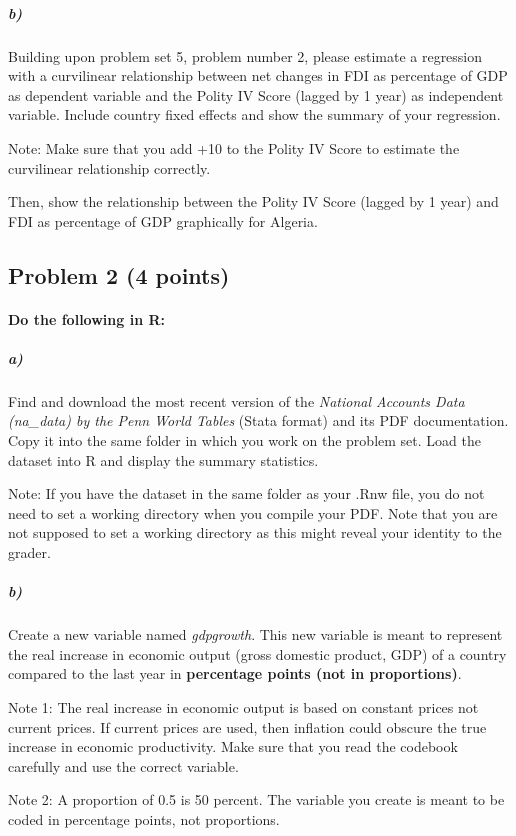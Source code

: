\documentclass[12pt]{article}
\begin{document}
\subparagraph{b)} Building upon problem set 5, problem number 2, please estimate a regression with a curvilinear relationship between net changes in FDI as percentage of GDP as dependent variable and the Polity IV Score (lagged by 1 year) as independent variable. Include country fixed effects and show the summary of your regression.

Note: Make sure that you add +10 to the Polity IV Score to estimate the curvilinear relationship correctly.

Then, show the relationship between the Polity IV Score (lagged by 1 year) and FDI as percentage of GDP graphically for Algeria.



\subsection*{Problem 2 (4 points)}

\paragraph{Do the following in R:}

\subparagraph{a)} Find and download the most recent version of the \textit{National Accounts Data (na\_data) by the Penn World Tables} (Stata format) and its PDF documentation. Copy it into the same folder in which you work on the problem set. Load the dataset into R and display the summary statistics.

Note: If you have the dataset in the same folder as your .Rnw file, you do not need to set a working directory when you compile your PDF. Note that you are not supposed to set a working directory as this might reveal your identity to the grader.

\subparagraph{b)} Create a new variable named \textit{gdpgrowth}. This new variable is meant to represent the real increase in economic output (gross domestic product, GDP) of a country compared to the last year in \textbf{percentage points (not in proportions)}.

Note 1: The real increase in economic output is based on constant prices not current prices. If current prices are used, then inflation could obscure the true increase in economic productivity. Make sure that you read the codebook carefully and use the correct variable.

Note 2: A proportion of 0.5 is 50 percent. The variable you create is meant to be coded in percentage points, not proportions.
\end{document}
